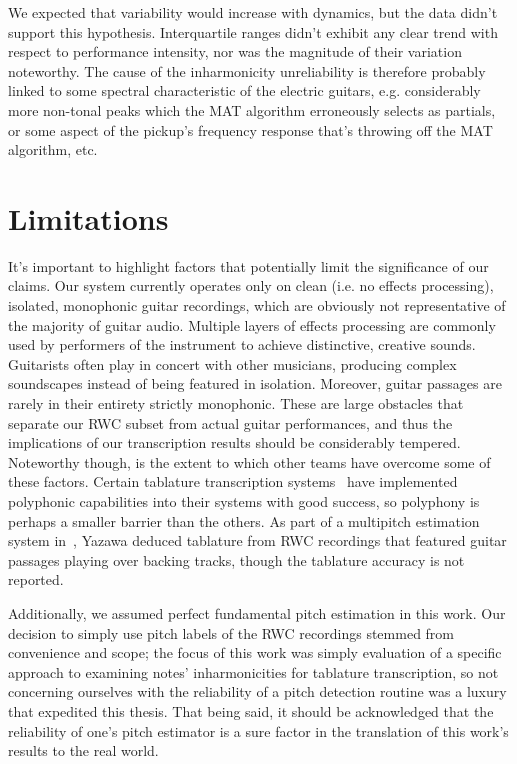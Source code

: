 \documentclass[12pt]{cmuthesis}
\begin{document}
We expected that variability would increase with dynamics, but the data didn't support this hypothesis. Interquartile ranges didn't exhibit any clear trend with respect to performance intensity, nor was the magnitude of their variation noteworthy. The cause of the inharmonicity unreliability is therefore probably linked to some spectral characteristic of the electric guitars, e.g. considerably more non-tonal peaks which the MAT algorithm erroneously selects as partials, or some aspect of the pickup's frequency response that's throwing off the MAT algorithm, etc.

\section{Limitations}
It's important to highlight factors that potentially limit the significance of our claims. Our system currently operates only on clean (i.e. no effects processing), isolated, monophonic guitar recordings, which are obviously not representative of the majority of guitar audio. Multiple layers of effects processing are commonly used by performers of the instrument to achieve distinctive, creative sounds. Guitarists often play in concert with other musicians, producing complex soundscapes instead of being featured in isolation. Moreover, guitar passages are rarely in their entirety strictly monophonic. These are large obstacles that separate our RWC subset from actual guitar performances, and thus the implications of our transcription results should be considerably tempered. Noteworthy though, is the extent to which other teams have overcome some of these factors. Certain tablature transcription systems~\cite{barbanchoi2012,abesser2012,dittmar2013,kehling2014} have implemented polyphonic capabilities into their systems with good success, so polyphony is perhaps a smaller barrier than the others. As part of a multipitch estimation system in~\cite{yazawa2013}, Yazawa deduced tablature from RWC recordings that featured guitar passages playing over backing tracks, though the tablature accuracy is not reported.

Additionally, we assumed perfect fundamental pitch estimation in this work. Our decision to simply use pitch labels of the RWC recordings stemmed from convenience and scope; the focus of this work was simply evaluation of a specific approach to examining notes' inharmonicities for tablature transcription, so not concerning ourselves with the reliability of a pitch detection routine was a luxury that expedited this thesis. That being said, it should be acknowledged that the reliability of one's pitch estimator is a sure factor in the translation of this work's results to the real world.
\end{document}
